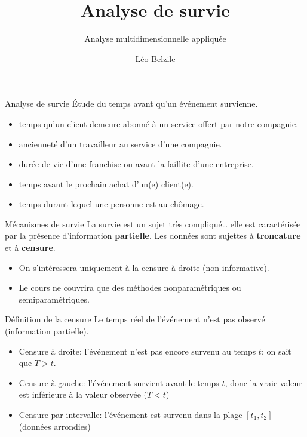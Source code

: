 \documentclass[
  ignorenonframetext,
]{beamer}
\title{\texorpdfstring{Analyse de survie}{Analyse de survie}}
\subtitle{\texorpdfstring{Analyse multidimensionnelle
appliquée}{Analyse multidimensionnelle appliquée}}
\author{Léo Belzile}
\date{}
\institute{HEC Montréal}
\providecommand{\tightlist}{%
  \setlength{\itemsep}{0pt}\setlength{\parskip}{0pt}}
\begin{document}
\frame{\titlepage}


\begin{frame}{Analyse de survie}
\protect{}\label{analyse-de-survie}
Étude du temps avant qu'un événement survienne.

\begin{itemize}
\tightlist
\item
  temps qu'un client demeure abonné à un service offert par notre
  compagnie.
\item
  ancienneté d'un travailleur au service d'une compagnie.
\item
  durée de vie d'une franchise ou avant la faillite d'une entreprise.
\item
  temps avant le prochain achat d'un(e) client(e).
\item
  temps durant lequel une personne est au chômage.
\end{itemize}
\end{frame}

\begin{frame}{Mécanismes de survie}
\protect{}\label{muxe9canismes-de-survie}
La survie est un sujet très compliqué\ldots{} elle est caractérisée par
la présence d'information \textbf{partielle}. Les données sont sujettes
à \textbf{troncature} et à \textbf{censure}.

\begin{itemize}
\tightlist
\item
  On s'intéressera uniquement à la censure à droite (non informative).
\item
  Le cours ne couvrira que des méthodes nonparamétriques ou
  semiparamétriques.
\end{itemize}
\end{frame}

\begin{frame}{Définition de la censure}
\protect{}\label{duxe9finition-de-la-censure}
Le temps réel de l'événement n'est pas observé (information partielle).

\begin{itemize}
\tightlist
\item
  Censure à droite: l'événement n'est pas encore survenu au temps \(t\):
  on sait que \(T > t\).
\item
  Censure à gauche: l'événement survient avant le temps \(t\), donc la
  vraie valeur est inférieure à la valeur observée (\(T < t\))
\item
  Censure par intervalle: l'événement est survenu dans la plage
  \([t_1, t_2]\) (données arrondies)
\end{itemize}
\end{frame}
\end{document}
